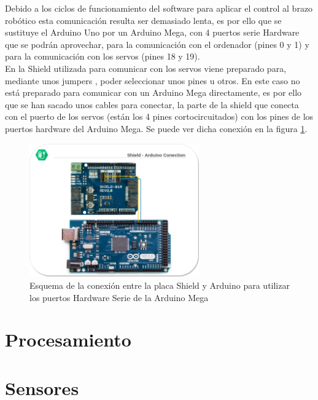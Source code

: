 	Debido a los ciclos de funcionamiento del software para aplicar el control al brazo robótico esta comunicación resulta ser demasiado lenta, es por ello que se sustituye el Arduino Uno por un Arduino Mega, con 4 puertos serie Hardware que se podrán aprovechar, para la comunicación con el ordenador (pines 0 y 1) y para la comunicación con los servos (pines 18 y 19).
	\\

	En la Shield utilizada para comunicar con los servos viene preparado para, mediante unos jumpers , poder seleccionar unos pines u otros. En este caso no está preparado para comunicar con un Arduino Mega directamente, es por ello que se han sacado unos cables para conectar, la parte de la shield que conecta con el puerto de los servos (están los 4 pines cortocircuitados) con los pines de los puertos hardware del Arduino Mega. Se puede ver dicha conexión en la figura \ref{fig:Electronica:shield-arduino}.

    \begin{figure}[H]
    	\centering
    	\includegraphics[width=0.65\textwidth]{figuras/Imagenes_Electronica/Shield-Arduino-Conection.png}
    	\caption{Esquema de la conexión entre la placa Shield y Arduino para utilizar los puertos Hardware Serie de la Arduino Mega}
    	\label{fig:Electronica:shield-arduino}
    \end{figure}
\section{Procesamiento}

\section{Sensores} \label{sec:Electronica:Sensores}
